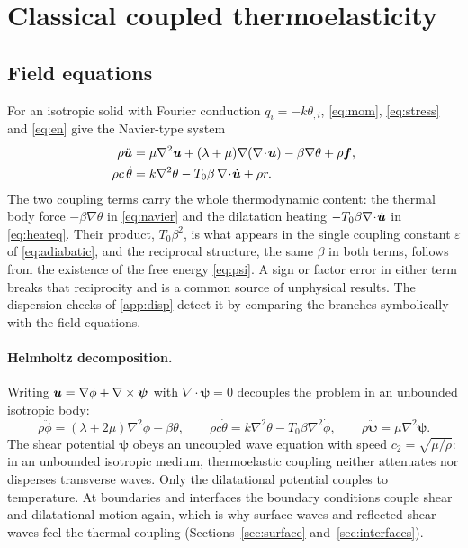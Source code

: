 \section{Classical coupled thermoelasticity}\label{sec:classical}
\subsection{Field equations}
For an isotropic solid with Fourier conduction $q_i=-k\theta_{,i}$, \eqref{eq:mom}, \eqref{eq:stress} and \eqref{eq:en} give the Navier-type system
\begin{align}
\rho\ddot{\bm u}&=\mu\nabla^2\bm u+(\lambda+\mu)\nabla(\nabla\!\cdot\!\bm u)-\beta\nabla\theta+\rho\bm f,\label{eq:navier}\\
\rho c\,\dot\theta&=k\nabla^2\theta-T_0\beta\,\nabla\!\cdot\!\dot{\bm u}+\rho r.\label{eq:heateq}
\end{align}
The two coupling terms carry the whole thermodynamic content: the thermal body force $-\beta\nabla\theta$ in \eqref{eq:navier} and the dilatation heating $-T_0\beta\nabla\!\cdot\!\dot{\bm u}$ in \eqref{eq:heateq}. Their product, $T_0\beta^2$, is what appears in the single coupling constant $\varepsilon$ of \eqref{eq:adiabatic}, and the reciprocal structure, the same $\beta$ in both terms, follows from the existence of the free energy \eqref{eq:psi}. A sign or factor error in either term breaks that reciprocity and is a common source of unphysical results. The dispersion checks of \cref{app:disp} detect it by comparing the branches symbolically with the field equations.

\paragraph{Helmholtz decomposition.} Writing $\bm u=\nabla\phi+\nabla\times\bm\psi$ with $\nabla\!\cdot\!\bm\psi=0$ decouples the problem in an unbounded isotropic body:
\begin{equation}
\rho\ddot\phi=(\lambda+2\mu)\nabla^2\phi-\beta\theta,\qquad
\rho c\dot\theta=k\nabla^2\theta-T_0\beta\nabla^2\dot\phi,\qquad
\rho\ddot{\bm\psi}=\mu\nabla^2\bm\psi.\label{eq:helm}
\end{equation}
The shear potential $\bm\psi$ obeys an uncoupled wave equation with speed $c_2=\sqrt{\mu/\rho}$: in an unbounded isotropic medium, thermoelastic coupling neither attenuates nor disperses transverse waves. Only the dilatational potential couples to temperature. At boundaries and interfaces the boundary conditions couple shear and dilatational motion again, which is why surface waves and reflected shear waves feel the thermal coupling (Sections~\ref{sec:surface} and~\ref{sec:interfaces}).

